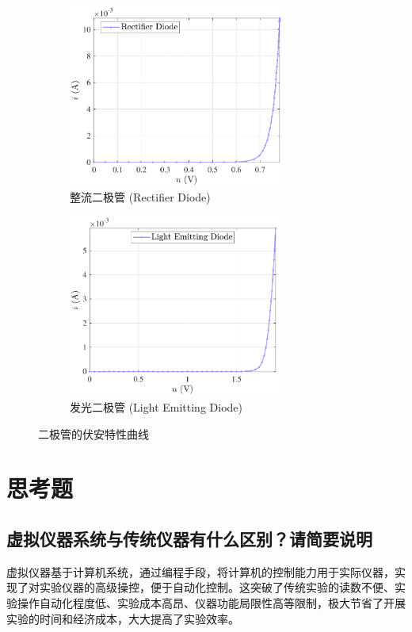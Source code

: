 \documentclass[UTF8]{article}
\theoremstyle{MyLineTheoremStyle} %
\theoremstyle{MyBlockTheoremStyle} %
\theoremstyle{MySubsubsectionStyle} %
\begin{document}
\begin{figure}[H]\centering
\begin{subfigure}[b]{0.5\columnwidth}\centering
    \includegraphics[height=170pt]{assets/整流二极管.pdf}
    \caption{ 整流二极管 (Rectifier Diode) }
\end{subfigure}\hfill
\begin{subfigure}[b]{0.5\columnwidth}\centering
    \includegraphics[height=170pt]{assets/发光二极管.pdf}
    \caption{ 发光二极管 (Light Emitting Diode) }
\end{subfigure}
\caption{二极管的伏安特性曲线}
\label{二极管}
\end{figure}

\section{思考题}

\subsection{虚拟仪器系统与传统仪器有什么区别？请简要说明}

虚拟仪器基于计算机系统，通过编程手段，将计算机的控制能力用于实际仪器，实现了对实验仪器的高级操控，便于自动化控制。这突破了传统实验的读数不便、实验操作自动化程度低、实验成本高昂、仪器功能局限性高等限制，极大节省了开展实验的时间和经济成本，大大提高了实验效率。
\end{document}
